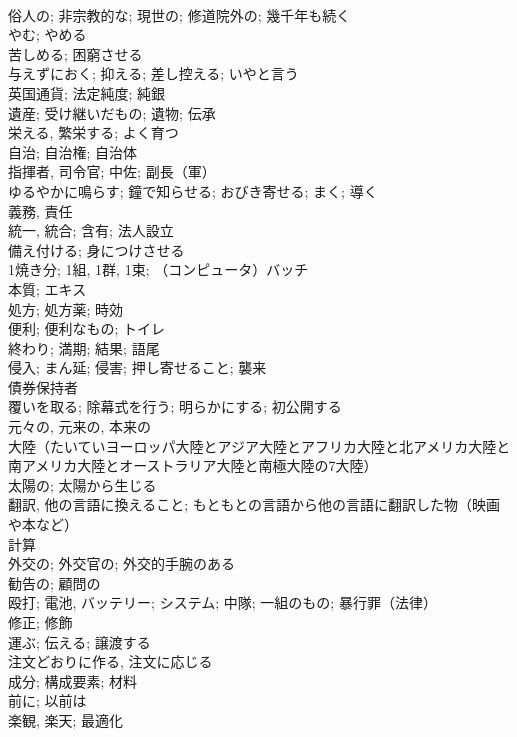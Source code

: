 \documentclass[8pt]{extreport}
\begin{document}
\begin{CJK}{UTF8}{min}
\\	俗人の; 非宗教的な; 現世の; 修道院外の; 幾千年も続く	
\\	やむ; やめる	
\\	苦しめる; 困窮させる	
\\	与えずにおく; 抑える; 差し控える; いやと言う	
\\	英国通貨; 法定純度; 純銀	
\\	遺産; 受け継いだもの; 遺物; 伝承	
\\	栄える, 繁栄する; よく育つ	
\\	自治; 自治権; 自治体	
\\	指揮者, 司令官; 中佐; 副長（軍）	
\\	ゆるやかに鳴らす; 鐘で知らせる; おびき寄せる; まく; 導く	
\\	義務, 責任	
\\	統一, 統合; 含有; 法人設立	
\\	備え付ける; 身につけさせる	
\\	1焼き分; 1組, 1群, 1束; （コンピュータ）バッチ	
\\	本質; エキス	
\\	処方; 処方薬; 時効	
\\	便利; 便利なもの; トイレ	
\\	終わり; 満期; 結果; 語尾	
\\	侵入; まん延; 侵害; 押し寄せること; 襲来	
\\	債券保持者	
\\	覆いを取る; 除幕式を行う; 明らかにする; 初公開する	
\\	元々の, 元来の, 本来の	
\\	大陸（たいていヨーロッパ大陸とアジア大陸とアフリカ大陸と北アメリカ大陸と南アメリカ大陸とオーストラリア大陸と南極大陸の7大陸）	
\\	太陽の; 太陽から生じる	
\\	翻訳, 他の言語に換えること; もともとの言語から他の言語に翻訳した物（映画や本など）	
\\	計算	
\\	外交の; 外交官の; 外交的手腕のある	
\\	勧告の; 顧問の	
\\	殴打; 電池, バッテリー; システム; 中隊; 一組のもの; 暴行罪（法律）	
\\	修正; 修飾	
\\	運ぶ; 伝える; 譲渡する	
\\	注文どおりに作る, 注文に応じる	
\\	成分; 構成要素; 材料	
\\	前に; 以前は	
\\	楽観, 楽天; 最適化	

\end{CJK}
\end{document}

